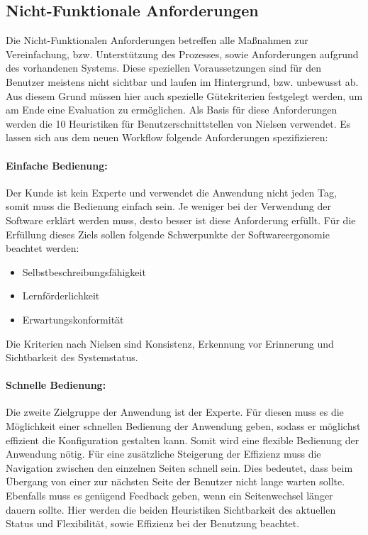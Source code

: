 \subsection{Nicht-Funktionale Anforderungen}\label{non_functional_requirements}
Die Nicht-Funktionalen Anforderungen betreffen alle Maßnahmen zur Vereinfachung, bzw. Unterstützung des Prozesses, sowie Anforderungen aufgrund des vorhandenen Systems. Diese speziellen Voraussetzungen sind für den Benutzer meistens nicht sichtbar und laufen im Hintergrund, bzw. unbewusst ab. Aus diesem Grund müssen hier auch spezielle Gütekriterien festgelegt werden, um am Ende eine Evaluation zu ermöglichen. Als Basis für diese Anforderungen werden die 10 Heuristiken für Benutzerschnittstellen von Nielsen \cite{bib:heuristicsNielsen} verwendet.
Es lassen sich aus dem neuen Workflow folgende Anforderungen spezifizieren:


\paragraph{Einfache Bedienung:} Der Kunde ist kein Experte und verwendet die Anwendung nicht jeden Tag, somit muss die Bedienung einfach sein. Je weniger bei der Verwendung der Software erklärt werden muss, desto besser ist diese Anforderung erfüllt. Für die Erfüllung dieses Ziels sollen folgende Schwerpunkte der Softwareergonomie \cite{bib:softwareErgonomie} beachtet werden: 
\begin{itemize}
        \item Selbstbeschreibungsfähigkeit
        \item Lernförderlichkeit
        \item Erwartungskonformität
\end{itemize}
Die Kriterien nach Nielsen sind Konsistenz, Erkennung vor Erinnerung und Sichtbarkeit des Systemstatus.

\paragraph{Schnelle Bedienung:} Die zweite Zielgruppe der Anwendung ist der Experte. Für diesen muss es die Möglichkeit einer schnellen Bedienung der Anwendung geben, sodass er möglichst effizient die Konfiguration gestalten kann. Somit wird eine flexible Bedienung der Anwendung nötig. Für eine zusätzliche Steigerung der Effizienz muss die Navigation zwischen den einzelnen Seiten schnell sein. Dies bedeutet, dass beim Übergang von einer zur nächsten Seite der Benutzer nicht lange warten sollte. Ebenfalls muss es genügend Feedback geben, wenn ein Seitenwechsel länger dauern sollte. Hier werden die beiden Heuristiken Sichtbarkeit des aktuellen Status und Flexibilität, sowie Effizienz bei der Benutzung beachtet.

